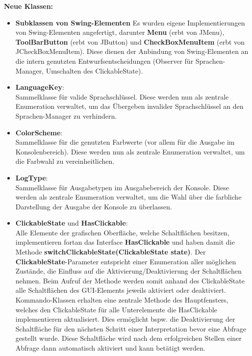 \documentclass[parskip=full,11pt,twoside]{scrartcl}
\begin{document}
\textbf{Neue Klassen:}\\
\begin{itemize}
	\item \textbf{Subklassen von Swing-Elementen}
	Es wurden eigene Implementierungen von Swing-Elementen angefertigt, darunter \textbf{Menu} (erbt von JMenu), \textbf{ToolBarButton} (erbt von JButton) und \textbf{CheckBoxMenuItem} (erbt von JCheckBoxMenuItem). Diese dienen der Anbindung von Swing-Elementen an die intern genutzten Entwurfsentscheidungen (Observer für Sprachen-Manager, Umschalten des ClickableState).
	\item \textbf{LanguageKey}:\\
	Sammelklasse für valide Sprachschlüssel. Diese werden nun als zentrale Enumeration verwaltet, um das Übergeben invalider Sprachschlüssel an den Sprachen-Manager zu verhindern.
	\item \textbf{ColorScheme}:\\
	Sammelklasse für die genutzten Farbwerte (vor allem für die Ausgabe im Konsolenbereich). Diese werden nun als zentrale Enumeration verwaltet, um die Farbwahl zu vereinheitlichen.
	\item \textbf{LogType}:\\
	Sammelklasse für Ausgabetypen im Ausgabebereich der Konsole. Diese werden als zentrale Enumeration verwaltet, um die Wahl über die farbliche Darstellung der Ausgabe der Konsole zu überlassen.
	\item \textbf{ClickableState} und \textbf{HasClickable}:\\
	Alle Elemente der grafischen Oberfläche, welche Schaltflächen besitzen, implementieren fortan das Interface \textbf{HasClickable} und haben damit die Methode \textbf{switchClickableState(ClickableState state)}. Der \textbf{ClickableState}-Parameter entspricht einer Enumeration aller möglichen Zustände, die Einfluss auf die Aktivierung/Deaktivierung der Schaltflächen nehmen. Beim Aufruf der Methode werden somit anhand des ClickableState alle Schaltflächen des GUI-Elements jeweils aktiviert oder deaktiviert. Kommando-Klassen erhalten eine zentrale Methode des Hauptfensters, welches den ClickableState für alle Unterelemente die HasClickable implementieren aktualisiert. Dies ermöglicht bspw. die Deaktivierung der Schaltfläche für den nächsten Schritt einer Interpretation bevor eine Abfrage gestellt wurde. Diese Schaltfläche wird nach dem erfolgreichen Stellen einer Abfrage dann automatisch aktiviert und kann betätigt werden.
\end{itemize}
\end{document}
